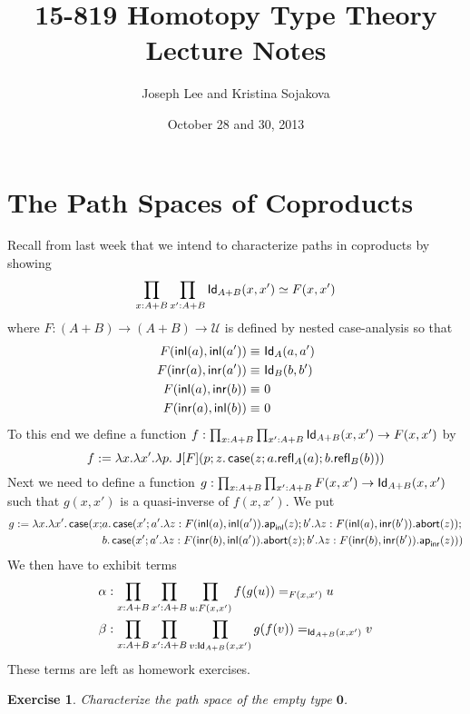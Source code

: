 \documentclass[12pt]{article}
\newcommand{\ap}{\mathsf{ap}}
\newcommand{\abort}{\mathsf{abort}}
\newtheorem*{exercise}{Exercise}
\begin{document}
\title{15-819 Homotopy Type Theory Lecture Notes} 
\author{Joseph Lee and Kristina Sojakova}
\date{October 28 and 30, 2013}

\maketitle

\section{The Path Spaces of Coproducts}\label{}

Recall from last week that we intend to characterize paths in coproducts by showing
\[ \prod_{x:A+B}\prod_{x':A+B} \mathsf{Id}_{A+B}(x,x') \simeq F(x,x') \]
where $F: (A+B) \to (A+B) \to \mathcal{U}$ is defined by nested case-analysis so that
\begin{align*}
 F({\mathsf{inl}}(a),{\mathsf{inl}}(a'))\equiv &\ \mathsf{Id}_{A}(a,a') \\
 F({\mathsf{inr}}(a),{\mathsf{inr}}(a'))\equiv &\ \mathsf{Id}_{B}(b,b') \\
 F({\mathsf{inl}}(a),{\mathsf{inr}}(b)) \equiv &\ 0 \\
 F({\mathsf{inr}}(a),{\mathsf{inl}}(b)) \equiv &\ 0
\end{align*}
To this end we define a function $f : \prod_{x:A+B}\prod_{x':A+B} \mathsf{Id}_{A+B}(x,x') \to F(x,x')$ by 
\[
f := \lambda x.\lambda x'.\lambda p.\; \mathsf{J}[F](p;z.\operatorname{\textsf{case}}(z;a.\mathsf{refl}_{A}(a);b.\mathsf{refl}_{B}(b)))
\]
Next we need to define a function $g:\prod_{x:A+B}\prod_{x':A+B} F(x,x')\to\mathsf{Id}_{A+B}(x,x')$ such that $g(x,x')$ is a quasi-inverse of $f(x,x')$.
We put
{\small
\begin{align*}
g := \lambda x.\lambda x'.\case(x;&a.\case(x';a'.\lambda z:F(\inl(a),\inl(a')).\ap_{\inl}(z);b'.\lambda z:F(\inl(a),\inr(b')).\abort(z));\\
                                  &b.\case(x';a'.\lambda z:F(\inr(b),\inl(a')).\abort(z);b'.\lambda z:F(\inr(b),\inr(b')).\ap_{\inr}(z)))
\end{align*}}
We then have to exhibit terms
\begin{align*}
\alpha&:\prod_{x:A+B}\prod_{x':A+B}\prod_{u:F(x,x')}f(g(u)) =_{F(x,x')} u\\
\beta&:\prod_{x:A+B}\prod_{x':A+B}\prod_{v:\mathsf{Id}_{A+B}(x,x')}g(f(v)) =_{\mathsf{Id}_{A+B}(x,x')} v
\end{align*}
These terms are left as homework exercises.

\begin{exercise}
Characterize the path space of the empty type $\mathbf{0}$.
\end{exercise}
\end{document}
